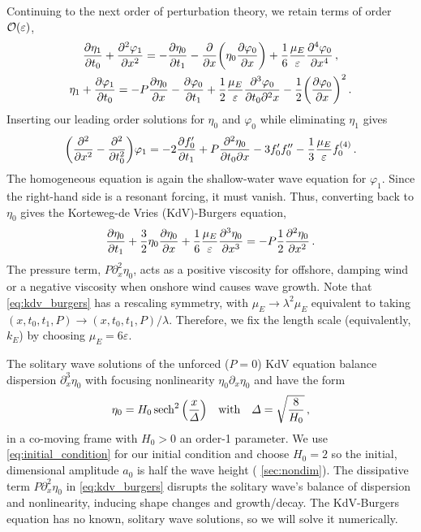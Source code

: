 \documentclass{jfm}
\renewcommand*{\epsilon}{\varepsilon}
\begin{document}
Continuing to the next order of perturbation theory, we retain terms of
order $\order{\epsilon}$,
\begin{gather}
    \pdv{\eta_1}{t_0} + \pdv[2]{\varphi_{1}}{x} =
      -\pdv{\eta_0}{t_1} - \pdv{x} \pqty{\eta_0 \pdv{\varphi_0}{x}} +
      \frac{1}{6} \frac{\mu_E}{\epsilon} \pdv[4]{\varphi_0}{x} \,,
  \\
    \eta_1 + \pdv{\varphi_1}{t_0} = -P \pdv{\eta_0}{x} -\pdv{\varphi_0}{t_1}
      + \frac{1}{2} \frac{\mu_E}{\epsilon} \frac{\partial^3 \varphi_0}
        {\partial t_0 \partial^2 x}
      - \frac{1}{2} \pqty{ \pdv{\varphi_0}{x} }^2
  \,.
\end{gather}
Inserting our leading order solutions for $\eta_0$ and $\varphi_0$ while
eliminating $\eta_1$ gives
\begin{equation}
  \pqty{\pdv[2]{x} - \pdv[2]{t_0}} \varphi_1 = -2 \pdv{f_0'}{t_1} +
    P\pdv{\eta_0}{t_0}{x} - 3 f_0' f_0'' - \frac{1}{3} \frac{\mu_E}{\epsilon}
    f_0^{(4)} \,.
\end{equation}
The homogeneous equation is again the shallow-water wave equation for
$\varphi_1$.
Since the right-hand side is a resonant forcing, it must vanish.
Thus, converting back to $\eta_0$ gives the Korteweg-de Vries
(KdV)-Burgers equation,
\begin{equation}
  \pdv{\eta_0}{t_1} + \frac{3}{2}
    \eta_0 \pdv{\eta_0}{x} + \frac{1}{6} \frac{\mu_E}{\epsilon}
    \pdv[3]{\eta_0}{x} = -P \frac{1}{2} \pdv[2]{\eta_0}{x} \,.
  \label{eq:kdv_burgers}
\end{equation}
The pressure term, $P \partial^2_x \eta_0$, acts as a positive viscosity
for offshore, damping wind or a negative viscosity when onshore wind
causes wave growth.
Note that \cref{eq:kdv_burgers} has a rescaling symmetry, with $\mu_E
\to \lambda^2 \mu_E$ equivalent to taking $(x,t_0,t_1,P) \to
(x,t_0,t_1,P)/\lambda$.
Therefore, we fix the length scale (equivalently, $k_E$) by choosing
$\mu_E = 6 \epsilon$.

The solitary wave solutions of the unforced ($P=0$) KdV equation
balance dispersion $\partial_x^3 \eta_0$ with focusing nonlinearity
$\eta_0 \partial_x \eta_0$ and have the form~\citep[\eg][]{mei2005nonlinear}
\begin{equation}
  \eta_0 = H_0 \sech^2\pqty{\frac{x}{\Delta}}
  \qq{with}
  \Delta = \sqrt{\frac{8}{H_0}} \,,
  \label{eq:initial_condition}
\end{equation}
in a co-moving frame with $H_0>0$ an order-1 parameter.
We use \cref{eq:initial_condition} for our initial condition and choose
$H_0 = 2$ so the initial, dimensional amplitude $a_0$ is half the wave
height (\cf{} \cref{sec:nondim}).
The dissipative term $P \partial_x^2 \eta_0$ in \cref{eq:kdv_burgers}
disrupts the solitary wave's balance of dispersion and nonlinearity,
inducing shape changes and growth/decay.
The KdV-Burgers equation has no known, solitary wave solutions, so we
will solve it numerically.
\end{document}
